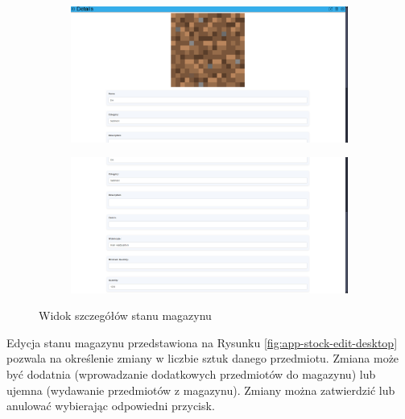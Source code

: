 \documentclass[../main.tex]{subfiles}
\begin{document}
            \begin{figure}[H]
                \begin{subfigure}{.49\textwidth}
                    \centering
                    \includegraphics[width=\getImageWidth]{images/app-desktop/app-stock-details1-desktop.png}
                    \label{fig:app-stock-details1-desktop}
                \end{subfigure}
                \begin{subfigure}{.49\textwidth}
                    \centering
                    \includegraphics[width=\getImageWidth]{images/app-desktop/app-stock-details2-desktop.png}
                    \label{fig:app-stock-details2-desktop}
                \end{subfigure}
                \caption{Widok szczegółów stanu magazynu}
                \label{fig:app-stock-details-desktop}
            \end{figure}
            
            Edycja stanu magazynu przedstawiona na Rysunku \ref{fig:app-stock-edit-desktop} pozwala na określenie zmiany w liczbie sztuk danego przedmiotu. Zmiana może być dodatnia (wprowadzanie dodatkowych przedmiotów do magazynu) lub ujemna (wydawanie przedmiotów z magazynu). Zmiany można zatwierdzić lub anulować wybierając odpowiedni przycisk.
\end{document}
